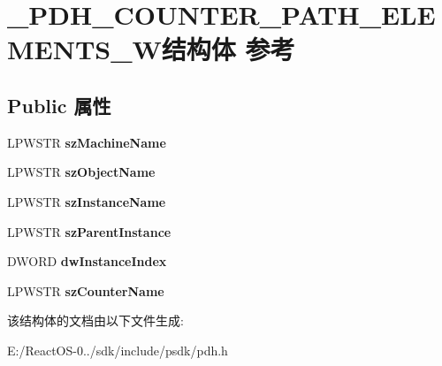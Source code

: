 \hypertarget{struct___p_d_h___c_o_u_n_t_e_r___p_a_t_h___e_l_e_m_e_n_t_s___w}{}\section{\+\_\+\+P\+D\+H\+\_\+\+C\+O\+U\+N\+T\+E\+R\+\_\+\+P\+A\+T\+H\+\_\+\+E\+L\+E\+M\+E\+N\+T\+S\+\_\+\+W结构体 参考}
\label{struct___p_d_h___c_o_u_n_t_e_r___p_a_t_h___e_l_e_m_e_n_t_s___w}
\subsection*{Public 属性}
\begin{DoxyCompactItemize}
\item 
\mbox{\label{struct___p_d_h___c_o_u_n_t_e_r___p_a_t_h___e_l_e_m_e_n_t_s___w_a7b12254e08e1725dfe5b378c7065874c}} 
L\+P\+W\+S\+TR {\bfseries sz\+Machine\+Name}
\item 
\mbox{\label{struct___p_d_h___c_o_u_n_t_e_r___p_a_t_h___e_l_e_m_e_n_t_s___w_a4fe0707c1a7ba965b91b736d098a87d6}} 
L\+P\+W\+S\+TR {\bfseries sz\+Object\+Name}
\item 
\mbox{\label{struct___p_d_h___c_o_u_n_t_e_r___p_a_t_h___e_l_e_m_e_n_t_s___w_a4d4d363d24175f24f7f1e7da2527d0e2}} 
L\+P\+W\+S\+TR {\bfseries sz\+Instance\+Name}
\item 
\mbox{\label{struct___p_d_h___c_o_u_n_t_e_r___p_a_t_h___e_l_e_m_e_n_t_s___w_ac32da10a4b40cd09f405f6174c0290ff}} 
L\+P\+W\+S\+TR {\bfseries sz\+Parent\+Instance}
\item 
\mbox{\label{struct___p_d_h___c_o_u_n_t_e_r___p_a_t_h___e_l_e_m_e_n_t_s___w_ab56934effce0aa75e300b522641fb7e9}} 
D\+W\+O\+RD {\bfseries dw\+Instance\+Index}
\item 
\mbox{\label{struct___p_d_h___c_o_u_n_t_e_r___p_a_t_h___e_l_e_m_e_n_t_s___w_a4d6519009ef08d5187e1a32c88ec135e}} 
L\+P\+W\+S\+TR {\bfseries sz\+Counter\+Name}
\end{DoxyCompactItemize}


该结构体的文档由以下文件生成\+:\begin{DoxyCompactItemize}
\item 
E\+:/\+React\+O\+S-\/0../sdk/include/psdk/pdh.\+h\end{DoxyCompactItemize}
